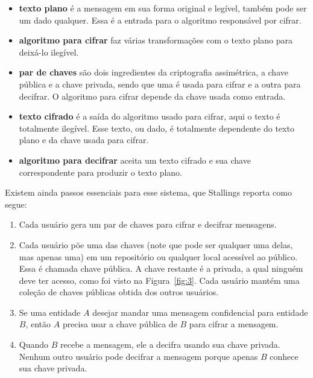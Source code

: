 \documentclass{article}
\begin{document}
\begin{itemize}
  \item \textbf{texto plano} é a mensagem em sua forma original e legível,
      também pode ser um dado qualquer. Essa é a entrada para o algoritmo
        responsável por cifrar.

  \item \textbf{algoritmo para cifrar} faz várias transformações com o texto
      plano para deixá-lo ilegível.

  \item \textbf{par de chaves} são dois ingredientes da criptografia
      assimétrica, a chave pública e a chave privada, sendo que uma é usada
        para cifrar e a outra para decifrar. O algoritmo para cifrar depende da
        chave usada como entrada.

  \item \textbf{texto cifrado} é a saída do algoritmo usado para cifrar, aqui
      o texto é totalmente ilegível. Esse texto, ou dado, é totalmente
        dependente do texto plano e da chave usada para cifrar.

  \item \textbf{algoritmo para decifrar} aceita um texto cifrado e sua chave
      correspondente para produzir o texto plano.
\end{itemize}

Existem ainda passos essenciais para esse sistema, que Stallings reporta como
segue:

\begin{enumerate}
  \item Cada usuário gera um par de chaves para cifrar e decifrar mensagens.

  \item Cada usuário põe uma das chaves (note que pode ser qualquer uma delas,
      mas apenas uma) em um repositório ou qualquer local acessível ao
        público. Essa é chamada chave pública. A chave restante é a privada,
        a qual ninguém deve ter acesso, como foi visto na
        Figura~\ref{fig:3}. Cada usuário mantém uma coleção de chaves públicas
        obtida dos outros usuários.

  \item Se uma entidade $A$ desejar mandar uma mensagem confidencial para
      entidade $B$, então $A$ precisa usar a chave pública de $B$ para cifrar
        a mensagem.

  \item Quando $B$ recebe a mensagem, ele a decifra usando sua chave
      privada. Nenhum outro usuário pode decifrar a mensagem porque apenas $B$
        conhece sua chave privada.
\end{enumerate}
\end{document}
